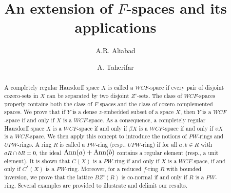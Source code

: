 \documentclass{amsart}
\theoremstyle{definition}
\theoremstyle{remark}
\numberwithin{equation}{section}
\newcommand{\Ann}{{\rm Ann}}
\theoremstyle{definition}\newtheorem{thm}{Theorem}[section]
\theoremstyle{definition}\newtheorem{cor}[thm]{Corollary}
\theoremstyle{definition}\newtheorem{lem}[thm]{Lemma}
\theoremstyle{definition}\newtheorem{prop}[thm]{Proposition}
\theoremstyle{definition}\newtheorem{defn}[thm]{Definition}
\theoremstyle{definition}\newtheorem{Rem}[thm]{Remark}
\theoremstyle{remark}\newtheorem{rem}[thm]{Remark}
\theoremstyle{definition}\newtheorem{exam}[thm]{Example}
\theoremstyle{definition}\newtheorem{qu}[thm]{question}
\begin{document}
\title[On $WCF$-spaces]
{An extension of $F$-spaces and its applications}


\author{A.R. Aliabad}
\address{Department of Mathematics, Sahid Chamran University, Ahvaz, Iran\newline \indent}

\author{A. Taherifar}
\address{Department of Mathematics, Yasouj University, Yasouj, Iran}



\begin{abstract}
A completely regular Hausdorff space $X$ is called a $WCF$-space if every pair of disjoint cozero-sets in $X$ can be separated by two disjoint $Z^{\circ}$-sets. The class of $WCF$-spaces properly contains both the class of $F$-spaces and the class of cozero-complemented spaces. We prove that if $Y$ is a dense $z$-embedded subset of a space $X$, then $Y$ is a $WCF$-space if and only if $X$ is a $WCF$-space. As a consequence, a completely regular Hausdorff space $X$ is a $WCF$-space if and only if $\beta X$ is a $WCF$-space if and only if $\upsilon X$ is a $WCF$-space. 
We then apply this concept to introduce the notions of $PW$-rings and $UPW$-rings. A ring $R$ is called a $PW$-ring (resp., $UPW$-ring) if for all $a, b \in R$ with $aR \cap bR = 0$, the ideal $\Ann(a)+\Ann(b)$ contains a regular element (resp., a unit element). It is shown that $C(X)$ is a $PW$-ring if and only if $X$ is a $WCF$-space, if and only if $C^{*}(X)$ is a $PW$-ring. Moreover, for a reduced $f$-ring  $R$ with bounded inversion, we prove that the lattice $BZ^{\circ}(R)$ is co-normal if and only if $R$ is a $PW$-ring. Several examples are provided to illustrate and delimit our results. 
\end{abstract}
\maketitle
\end{document}

